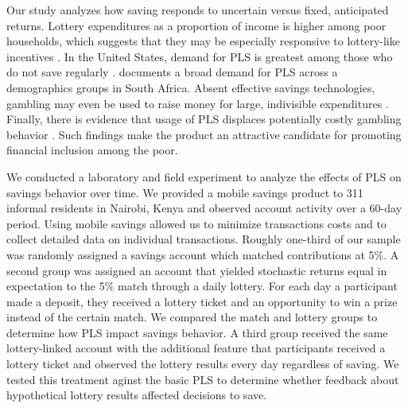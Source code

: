 \documentclass[11pt]{article}
\begin{document}
	Our study analyzes how saving responds to uncertain versus fixed, anticipated returns. Lottery expenditures as a proportion of income is higher among poor households, which suggests that they may be especially responsive to lottery-like incentives \parencite{brown_socio-economic_1992,kearney_making_2010,barnes_gambling_2011}. In the United States, demand for PLS is greatest among those who do not save regularly \parencite{tufano_u.s._2011}. \textcite{shawn_allen_cole_can_2014} documents a broad demand for PLS across a demographics groups in South Africa. Absent effective savings technologies, gambling may even be used to raise money for large, indivisible expenditures \parencite{herskowitz_gambling_2016}. Finally, there is evidence that usage of PLS displaces potentially costly gambling behavior \parencite{atalay_savings_2014,shawn_allen_cole_can_2014,cookson_when_2016}. Such findings make the product an attractive candidate for promoting financial inclusion among the poor.


	We conducted a laboratory and field experiment to analyze the effects of PLS on savings behavior over time. We provided a mobile savings product to 311 informal residents in Nairobi, Kenya and observed account activity over a 60-day period. Using mobile savings allowed us to minimize transactions costs and to collect detailed data on individual transactions. Roughly one-third of our sample was randomly assigned a savings account which matched contributions at 5\%. A second group was assigned an account that yielded stochastic returns equal in expectation to the 5\% match through a daily lottery. For each day a participant made a deposit, they received a lottery ticket and an opportunity to win a prize instead of the certain match. We compared the match and lottery groups to determine how PLS impact savings behavior. A third group received the same lottery-linked account with the additional feature that participants received a lottery ticket and observed the lottery results every day regardless of saving. We tested this treatment aginst the basic PLS to determine whether feedback about hypothetical lottery results affected decisions to save.

\end{document}
